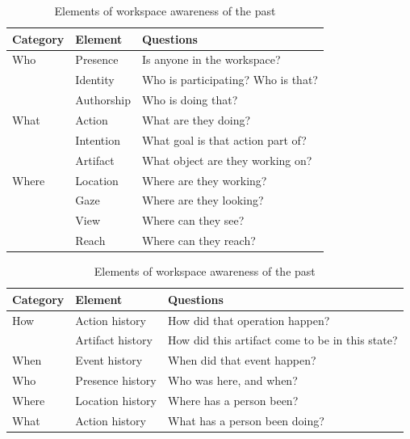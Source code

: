    \begin{table}[!ht]
        \centering
        \caption{Elements of workspace awareness of the present \cite{gutwinDescriptiveFrameworkWorkspace2002}}
        \begin{tabular}{lll}
             \hline
             Category & Element & Questions \\
             \hline
             Who & Presence  & Is anyone in the workspace? \\
             & Identity  & Who is participating? Who is that? \\
             \vspace{0.7em}
            
             & Authorship & Who is doing that? \\
             What & Action & What are they doing? \\
             & Intention & What goal is that action part of? \\
             \vspace{0.7em}
            
             & Artifact & What object are they working on? \\
             Where & Location & Where are they working? \\
             & Gaze & Where are they looking? \\
             & View & Where can they see? \\
             & Reach & Where can they reach? \\
        \end{tabular}
        \vspace{1em}
        
        \label{tab:workspaceElementsPresent}

        \bigskip
        \caption{Elements of workspace awareness of the past \cite{gutwinDescriptiveFrameworkWorkspace2002}}
        \begin{tabular}{lll}
             \hline
             Category & Element & Questions \\
             \hline
             How & Action history & How did that operation happen? \\
             \vspace{0.7em}
              & Artifact history & How did this artifact come to be in this state? \\
            \vspace{0.7em}
             When & Event history & When did that event happen? \\
             \vspace{0.7em}
             Who & Presence history & Who was here, and when? \\
             \vspace{0.7em}
             Where & Location history & Where has a person been? \\
             \vspace{0.7em}
             What & Action history  & What has a person been doing? \\
            

\end{tabular}
\end{table}
